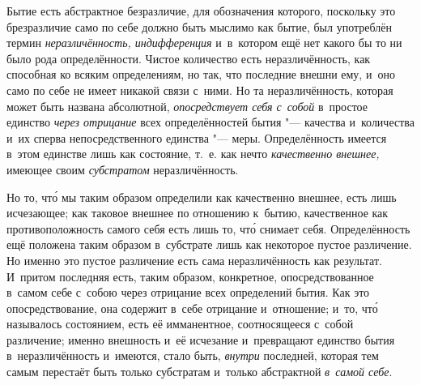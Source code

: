 
Бытие есть абстрактное безразличие, для обозначения которого, поскольку это
брезразличие само по себе должно быть мыслимо как бытие, был употреблён
термин {\em неразличённость, индифференция}
и~в~котором ещё нет какого бы то ни было рода определённости. Чистое количество
есть неразличённость, как способная ко всяким определениям, но так, что
последние внешни ему, и~оно само по себе не имеет никакой связи с~ними. Но та
неразличённость, которая может быть названа абсолютной, {\em опосредствует себя
с~собой} в~простое единство {\em через отрицание} всех определённостей бытия
"--- качества и~количества и~их сперва непосредственного единства "--- меры.
Определённость имеется в~этом единстве лишь как состояние, т.~е. как нечто
{\em качественно внешнее,} имеющее своим {\em субстратом} неразличённость.

Но то, чт\'{о} мы таким образом определили как качественно внешнее, есть лишь
исчезающее; как таковое внешнее по отношению к~бытию, качественное как
противоположность самого себя есть лишь то, чт\'{о} снимает себя.
Определённость ещё положена таким образом в~субстрате лишь как некоторое пустое
различение. Но именно это пустое различение есть сама неразличённость
как результат. И~притом последняя есть, таким образом, конкретное,
опосредствованное в~самом себе с~собою через отрицание всех определений бытия.
Как это опосредствование, она содержит в~себе отрицание и~отношение; и~то,
чт\'{о} называлось состоянием, есть её имманентное, соотносящееся с~собой
различение; именно внешность и~её исчезание и~превращают единство бытия
в~неразличённость и~имеются, стало быть, {\em внутри} последней, которая тем
самым перестаёт быть только субстратам и~только абстрактной {\em в~самой себе}.

